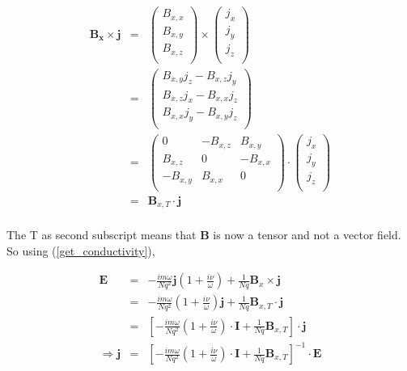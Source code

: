 \documentclass[a4paper,10pt]{thesis}
\begin{document}
\begin{eqnarray}
    \mathbf{B_x}\times \mathbf{j}&=&\left(%
\begin{array}{c}
  B_{x,x} \\
B_{x,y} \\
B_{x,z} \\\end{array}%
\right) \times \left(
\begin{array}{c}
  j_{x} \\
j_{y} \\
j_{z} \\\end{array}%
\right)\\
&=&\left(%
\begin{array}{c}
  B_{x,y} j_{z} -  B_{x,z} j_{y}\\
B_{x,z} j_{x} -  B_{x,x} j_{z} \\
B_{x,x} j_{y} -  B_{x,y} j_{z} \\\end{array}%
\right)\\
&=&\left(%
\begin{array}{ccc}
  0 & -B_{x,z} & B_{x,y} \\
B_{x,z} & 0 & -B_{x,x} \\
-B_{x,y} & B_{x,x} & 0 \\\end{array}%
\right)\cdot \left(
\begin{array}{c}
  j_{x} \\
j_{y} \\
j_{z} \\\end{array}%
\right)\\
&=&\mathbf{B}_{x,T} \cdot \mathbf{j}
\end{eqnarray}


\paragraph*{}
The T as second subscript means that \textbf{B} is now a tensor and not a vector field. So using (\ref{get_conductivity}),

\begin{eqnarray}
    \mathbf{E}&=& -\frac{i m \omega }{Nq^2}\mathbf{j} \left( 1   +  \frac{i \nu}{ \omega}\right) +\frac{1}{Nq} \mathbf{B}_x \times \mathbf{j}\\
&=& -\frac{i m \omega }{Nq^2} \left( 1   +  \frac{i \nu}{ \omega}\right) \mathbf{j}+\frac{1}{Nq} \mathbf{B}_{x,T} \cdot \mathbf{j}\nonumber \\
&=& \left[ -\frac{i m \omega }{Nq^2} \left( 1   +  \frac{i \nu}{ \omega}\right) \cdot \mathbf{I}+\frac{1}{Nq} \mathbf{B}_{x,T} \right] \cdot \mathbf{j}\nonumber \\
\Rightarrow \mathbf{j} &=& \left[ -\frac{i m \omega }{Nq^2} \left( 1   +  \frac{i \nu}{ \omega}\right) \cdot \mathbf{I}+\frac{1}{Nq} \mathbf{B}_{x,T} \right]^{-1} \cdot \mathbf{E}
\end{eqnarray}
\end{document}
